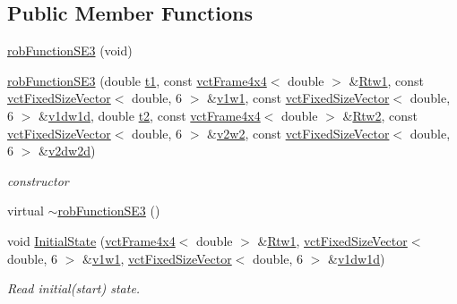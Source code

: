 \subsection*{Public Member Functions}
\begin{DoxyCompactItemize}
\item 
\hyperlink{classrob_function_s_e3_a58865d30da85b8a4aecd3efdbeec7a2e}{rob\+Function\+S\+E3} (void)
\item 
\hyperlink{classrob_function_s_e3_a2e17ff5e098e578d97351da3a416c927}{rob\+Function\+S\+E3} (double \hyperlink{classrob_function_a9a4b408a3a5a8ae927caec3b6bac36ef}{t1}, const \hyperlink{classvct_frame4x4}{vct\+Frame4x4}$<$ double $>$ \&\hyperlink{classrob_function_s_e3_a16c18215d20446f2bd11e7f54ace81a6}{Rtw1}, const \hyperlink{classvct_fixed_size_vector}{vct\+Fixed\+Size\+Vector}$<$ double, 6 $>$ \&\hyperlink{classrob_function_s_e3_a7b1d1ec3899e5c1f95c90fa2b3834e6e}{v1w1}, const \hyperlink{classvct_fixed_size_vector}{vct\+Fixed\+Size\+Vector}$<$ double, 6 $>$ \&\hyperlink{classrob_function_s_e3_a0293adc3a9e5b8bd7f24dded9a70071a}{v1dw1d}, double \hyperlink{classrob_function_abf15c2d695ab4cc6336e19862327858f}{t2}, const \hyperlink{classvct_frame4x4}{vct\+Frame4x4}$<$ double $>$ \&\hyperlink{classrob_function_s_e3_a06d362ebf89c4f6a3984c4097a810a27}{Rtw2}, const \hyperlink{classvct_fixed_size_vector}{vct\+Fixed\+Size\+Vector}$<$ double, 6 $>$ \&\hyperlink{classrob_function_s_e3_a9e6845bf899f02dcab9dc56d59923787}{v2w2}, const \hyperlink{classvct_fixed_size_vector}{vct\+Fixed\+Size\+Vector}$<$ double, 6 $>$ \&\hyperlink{classrob_function_s_e3_ab91a09514cf4b5f4b2626ed8e44133c0}{v2dw2d})
\begin{DoxyCompactList}\small\item\em constructor \end{DoxyCompactList}\item 
virtual \hyperlink{classrob_function_s_e3_a1177738ebad1c25e918b47169ac71ec7}{$\sim$rob\+Function\+S\+E3} ()
\item 
void \hyperlink{classrob_function_s_e3_a28ab7297874b819fda648e928b1b1995}{Initial\+State} (\hyperlink{classvct_frame4x4}{vct\+Frame4x4}$<$ double $>$ \&\hyperlink{classrob_function_s_e3_a16c18215d20446f2bd11e7f54ace81a6}{Rtw1}, \hyperlink{classvct_fixed_size_vector}{vct\+Fixed\+Size\+Vector}$<$ double, 6 $>$ \&\hyperlink{classrob_function_s_e3_a7b1d1ec3899e5c1f95c90fa2b3834e6e}{v1w1}, \hyperlink{classvct_fixed_size_vector}{vct\+Fixed\+Size\+Vector}$<$ double, 6 $>$ \&\hyperlink{classrob_function_s_e3_a0293adc3a9e5b8bd7f24dded9a70071a}{v1dw1d})
\begin{DoxyCompactList}\small\item\em Read initial(start) state. \end{DoxyCompactList}\item 

\end{DoxyCompactItemize}
